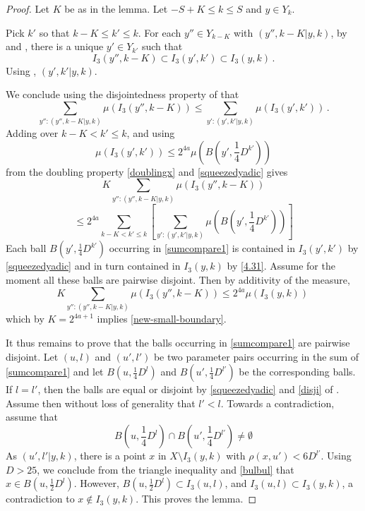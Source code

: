 \begin{proof}
Let $K$ be as in the lemma. Let $-S+K\le k\le S$ and $y\in Y_k$.

Pick $k'$ so that $k-K\le k'\le k$.
For each $y''\in Y_{k-K}$ with $(y'',k-K| y,k)$,
by  and , there is a unique $y'\in Y_{k'}$ such that
\begin{equation}\label{4.31}
    I_3(y'',k-K)\subset I_3(y',k')\subset I_3(y,k)\, .
\end{equation}
Using , $(y',k'|y,k)$.

We conclude using the disjointedness property of
 that
\begin{equation}\label{scalecompare}
    \sum_{y'': (y'',k-K|y,k)}\mu(I_3(y'',k-K))
   \le
\sum_{y': (y',k'|y,k)}
\mu(I_3(y',k')) \, .
   \end{equation}
Adding over $k-K<k'\le k$, and using
\[\mu(I_3(y',k'))\le 2^{4a} \mu(B(y', \frac 14 D^{k'}))\]
from the doubling property \eqref{doublingx} and
\eqref{squeezedyadic} gives
\begin{equation}\label{sumcompare}
    K\sum_{y'': (y'',k-K|y,k)}
    \mu(I_3(y'',k-K))
\end{equation}
\begin{equation}\label{sumcompare1}
    \le 2^{4a} \sum_{k-K<k'\le k}
   \left[ \sum_{y': (y',k'|y,k)}
\mu(B(y', \frac 14 D^{k'}))\right]
\end{equation}
Each ball $B(y', \frac 14 D^{k'})$ occurring in
\eqref{sumcompare1} is contained in $I_3(y',k')$
by \eqref{squeezedyadic} and in turn contained in
$I_3(y,k)$ by \eqref{4.31}. Assume for the moment all these balls are pairwise disjoint. Then
by additivity of the measure,
\begin{equation}
    K\sum_{y'': (y'',k-K|y,k)}
    \mu(I_3(y'',k-K))
    \le 2^{4a}
\mu(I_3(y,k))\,
\end{equation}
which by $K=2^{4a+1}$ implies \eqref{new-small-boundary}.

It thus remains to prove that the balls
occurring in
\eqref{sumcompare1} are pairwise disjoint.
Let $(u,l)$ and $(u',l')$ be two parameter pairs occurring
in the sum of \eqref{sumcompare1} and let
$ B(u, \frac 14 D^l)$ and $B({u'}, \frac 14 D^{l'})$
be the corresponding balls. If
$l=l'$, then the balls are equal or disjoint by
\eqref{squeezedyadic} and \eqref{disji} of . Assume then without loss of generality that $l'<l$. Towards a contradiction, assume that
\begin{equation}\label{bulbul}
    B(u, \frac 14 D^l)\cap B({u'}, \frac 14 D^{l'})\neq \emptyset
\end{equation}
As $(u',l'|y,k)$, there is a point $x$ in
$X\setminus I_3(y,k)$ with $\rho(x,u')<6D^{l'}$.
Using $D>25$, we conclude from the triangle inequality and \eqref{bulbul} that
$x\in B(u,\frac 12D^l)$. However, $B(u,\frac 12 D^l)\subset I_3(u,l)$,
and $I_3(u,l)\subset I_3(y,k)$, a contradiction to
$x\not\in I_3(y,k)$.
This proves the lemma.
\end{proof}

